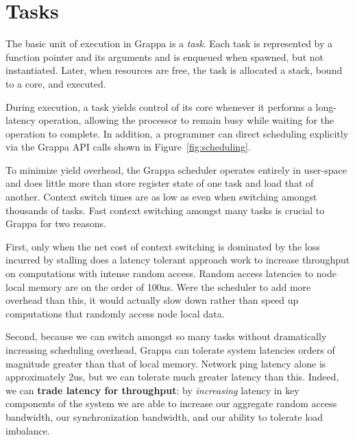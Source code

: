 \section{Tasks}

The basic unit of execution in Grappa is a {\em task}. Each task is
represented by a function pointer and its arguments and is enqueued when
spawned, but not instantiated.  Later, when resources are free,
the task is allocated a stack, bound to a core, and executed.

During execution, a task yields control of its core whenever it performs
a long-latency operation, allowing the processor to remain busy while
waiting for the operation to complete.  In addition,  a programmer can
direct scheduling explicitly via the Grappa API calls shown
in Figure~\ref{fig:scheduling}.

To minimize yield overhead, the Grappa scheduler operates entirely in
user-space and does little more than store register state of one task and load that of another. Context switch times are as
low as  even when switching amongst thousands of tasks.
Fast context switching amongst many tasks is crucial to Grappa for two reasons. 

First, only when the net cost of context switching is dominated by the loss incurred by stalling does a latency tolerant approach work to increase throughput on computations with intense random access.  Random access latencies to node local memory are on the order of 100ns.  Were the scheduler to add more overhead than this, it would actually slow down rather than speed up computations that randomly access node local data.

Second, because we can switch amongst so many tasks without dramatically increasing scheduling overhead, Grappa can tolerate system latencies orders of magnitude greater than that of local memory.  Network ping latency alone is approximately 2us, but we can tolerate much greater latency than this.  Indeed, we can \textbf{trade latency for throughput}:  by {\em increasing} latency in key components of the system we are able to increase our aggregate random access bandwidth,
our synchronization bandwidth, and our ability to tolerate load
imbalance.

